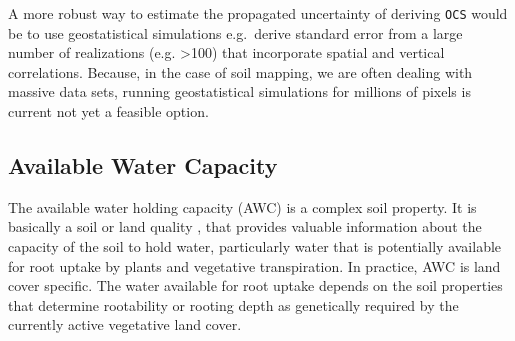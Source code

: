 \documentclass[graybox,natbib,nospthms,UStrade]{svmono}
\newenvironment{Shaded}{\begin{snugshade}}{\end{snugshade}}
\newcommand{\CommentTok}[1]{\textcolor[rgb]{0.37,0.37,0.37}{\textit{#1}}}
\newcommand{\DecValTok}[1]{\textcolor[rgb]{0.06,0.06,0.06}{#1}}
\newcommand{\FloatTok}[1]{\textcolor[rgb]{0.06,0.06,0.06}{#1}}
\newcommand{\KeywordTok}[1]{\textcolor[rgb]{0.27,0.27,0.27}{\textbf{#1}}}
\newcommand{\NormalTok}[1]{#1}
\newcommand{\OperatorTok}[1]{\textcolor[rgb]{0.43,0.43,0.43}{\textbf{#1}}}
\newcommand{\StringTok}[1]{\textcolor[rgb]{0.5,0.5,0.5}{#1}}
\begin{document}
\begin{Shaded}
\end{Shaded}

A more robust way to estimate the propagated uncertainty of deriving
\texttt{OCS} would be to use geostatistical simulations e.g.~derive standard
error from a large number of realizations (e.g. \textgreater{}100) that incorporate
spatial and vertical correlations. Because, in the case of soil mapping,
we are often dealing with massive data sets, running geostatistical
simulations for millions of pixels is current not yet a feasible option.

\hypertarget{available-water-capacity}{%
\subsection{Available Water Capacity}\label{available-water-capacity}}

The available water holding capacity (AWC) is a complex soil property.
It is basically a soil or land quality \citep{food1977framework}, that
provides valuable information about the capacity of the soil to hold
water, particularly water that is potentially available for root uptake
by plants and vegetative transpiration. In practice, AWC is land cover specific.
The water available for root uptake depends on the soil properties that
determine rootability or rooting depth as genetically required by the
currently active vegetative land cover.
\end{document}
